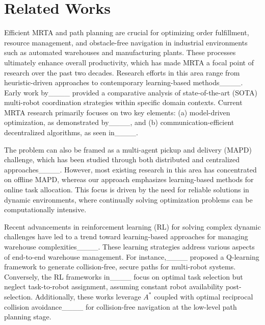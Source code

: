 \section{Related Works}
Efficient MRTA and path planning are crucial for optimizing order fulfillment, resource management, and obstacle-free navigation in industrial environments such as automated warehouses and manufacturing plants. These processes ultimately enhance overall productivity, which has made MRTA a focal point of research over the past two decades. Research efforts in this area range from heuristic-driven approaches to contemporary learning-based methods____. Early work by____ provided a comparative analysis of state-of-the-art (SOTA) multi-robot coordination strategies within specific domain contexts. Current MRTA research primarily focuses on two key elements: (a) model-driven optimization, as demonstrated by____, and (b) communication-efficient decentralized algorithms, as seen in____.

The problem can also be framed as a multi-agent pickup and delivery (MAPD) challenge, which has been studied through both distributed and centralized approaches____. However, most existing research in this area has concentrated on offline MAPD, whereas our approach emphasizes learning-based methods for online task allocation. This focus is driven by the need for reliable solutions in dynamic environments, where continually solving optimization problems can be computationally intensive.

Recent advancements in reinforcement learning (RL) for solving complex dynamic challenges have led to a trend toward learning-based approaches for managing warehouse complexities____. These learning strategies address various aspects of end-to-end warehouse management. For instance,____ proposed a Q-learning framework to generate collision-free, secure paths for multi-robot systems. Conversely, the RL frameworks in____ focus on optimal task selection but neglect task-to-robot assignment, assuming constant robot availability post-selection. Additionally, these works leverage $A^*$ coupled with optimal reciprocal collision avoidance____ for collision-free navigation at the low-level path planning stage.


